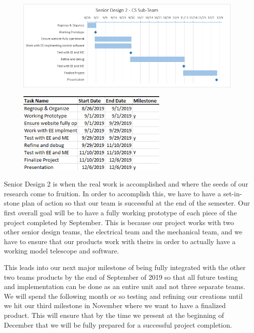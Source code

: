 \documentclass[12pt]{article}
\begin{document}
\begin{figure}[h]
	\centering
	\includegraphics[width=\linewidth]{SD2Gantt}
\end{figure}

\begin{figure}[h]
	\centering
	\includegraphics[width=0.6\linewidth, height=4.0cm]{SD2Dates}
\end{figure}

Senior Design 2 is when the real work is accomplished and where the seeds of our research come to fruition. In order to accomplish this, we have to have a set-in-stone plan of action so that our team is successful at the end of the semester. Our first overall goal will be to have a fully working prototype of each piece of the project completed by September. This is because our project works with two other senior design teams, the electrical team and the mechanical team, and we have to ensure that our products work with theirs in order to actually have a working model telescope and software.

This leads into our next major milestone of being fully integrated with the other two teams products by the end of September of 2019 so that all future testing and implementation can be done as an entire unit and not three separate teams. We will spend the following month or so testing and refining our creations until we hit our third milestone in November where we want to have a finalized product. This will ensure that by the time we present at the beginning of December that we will be fully prepared for a successful project completion.
\end{document}
